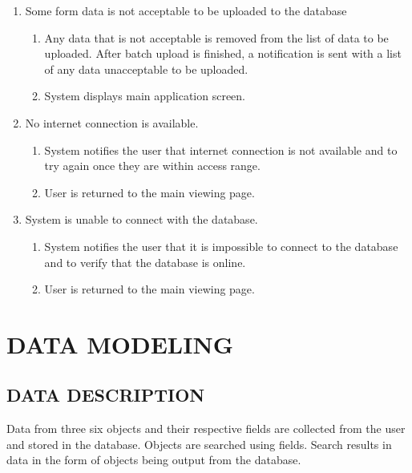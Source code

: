 \documentclass[twoside,letterpaper]{article}
\begin{document}
\begin{enumerate}
\item Some form data is not acceptable to be uploaded to the database
\begin{enumerate}
\item Any data that is not acceptable is removed from the list of data to be uploaded. After batch upload is finished, a notification is sent with a list of any data unacceptable to be uploaded.
\item System displays main application screen.
\end{enumerate}

\item No internet connection is available.
\begin{enumerate}
\item System notifies the user that internet connection is not available and to try again once they are within access range.
\item User is returned to the main viewing page.
\end{enumerate}

\item System is unable to connect with the database.
\begin{enumerate}
\item System notifies the user that it is impossible to connect to the database and to verify that the database is online.
\item User is returned to the main viewing page.
\end{enumerate}
\end{enumerate}

\clearpage\section[DATA MODELING]{\rmfamily\bfseries\color{black}
DATA MODELING}
\subsection{DATA DESCRIPTION}
{\rmfamily\color{black}
Data from three six objects and their respective fields are collected from the user and stored in the database.  Objects are searched using fields.  Search results in data in the form of objects being output from the database.}
\end{document}

